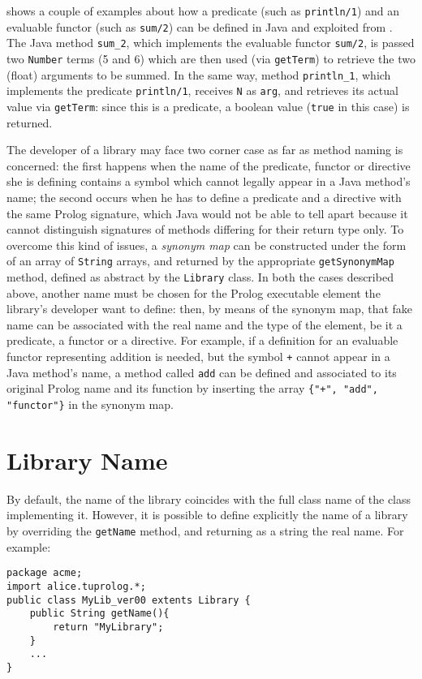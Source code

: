  shows a couple of examples about how a predicate
(such as \texttt{println/1}) and an evaluable functor (such as
\texttt{sum/2}) can be defined in Java and exploited from
\tuprolog{}.
%
The Java method \texttt{sum\_2}, which implements the evaluable
functor \texttt{sum/2}, is passed two \texttt{Number} terms (5 and 6)
which are then used (via \texttt{getTerm}) to retrieve the two
(float) arguments to be summed.
%
In the same way, method \texttt{println\_1}, which implements the
predicate \texttt{println/1}, receives \texttt{N} as \texttt{arg},
and retrieves its actual value via \texttt{getTerm}: since this is
a predicate, a boolean value (\texttt{true} in this case) is returned.
%

The developer of a library may face two corner case as far as method
naming is concerned: the first happens when the name of the
predicate, functor or directive she is defining contains a symbol
which cannot legally appear in a Java method's name; the second
occurs when he has to define a predicate and a directive with the
same Prolog signature, which Java would not be able to tell apart
because it cannot distinguish signatures of methods differing for
their return type only.
%
To overcome this kind of issues, a {\em synonym map} can be
constructed under the form of an array of \texttt{String} arrays,
and returned by the appropriate \texttt{getSynonymMap} method,
defined as abstract by the \texttt{Library} class. In both the cases
described above, another name must be chosen for the Prolog
executable element the library's developer want to define: then, by
means of the synonym map, that fake name can be associated with the
real name and the type of the element, be it a predicate, a functor
or a directive.
%
For example, if a definition for an evaluable functor representing
addition is needed, but the symbol \texttt{+} cannot appear in a
Java method's name, a method called \texttt{add} can be defined and
associated to its original Prolog name and its function by inserting
the array \texttt{\{"+", "add", "functor"\}} in the synonym map.

\section{Library Name}

%
By default, the name of the library coincides with the full class name of the
class implementing it.
%
However, it is possible to define explicitly the name of a library by
overriding the \texttt{getName} method, and returning as a string
the real name.
%
For example:
%
\begin{verbatim}
package acme;
import alice.tuprolog.*;
public class MyLib_ver00 extents Library {
    public String getName(){
        return "MyLibrary";
    }
    ...
}
\end{verbatim}

